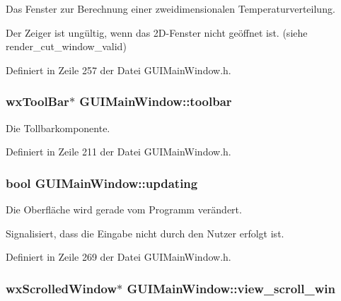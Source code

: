 Das Fenster zur Berechnung einer zweidimensionalen Temperaturverteilung. 

Der Zeiger ist ungültig, wenn das 2\-D-\/\-Fenster nicht geöffnet ist. (siehe render\-\_\-cut\-\_\-window\-\_\-valid) 

Definiert in Zeile 257 der Datei G\-U\-I\-Main\-Window.\-h.

\hypertarget{classGUIMainWindow_a8a8638fa87b4080e2242812f3d7e469e}{
\subsubsection[{toolbar}]{\setlength{\rightskip}{0pt plus 5cm}wx\-Tool\-Bar$\ast$ G\-U\-I\-Main\-Window\-::toolbar\hspace{0.3cm}{\ttfamily [private]}}}\label{classGUIMainWindow_a8a8638fa87b4080e2242812f3d7e469e}


Die Tollbarkomponente. 



Definiert in Zeile 211 der Datei G\-U\-I\-Main\-Window.\-h.

\hypertarget{classGUIMainWindow_afdc35b04c0fe94e4d0080f659ecbce8c}{
\subsubsection[{updating}]{\setlength{\rightskip}{0pt plus 5cm}bool G\-U\-I\-Main\-Window\-::updating\hspace{0.3cm}{\ttfamily [private]}}}\label{classGUIMainWindow_afdc35b04c0fe94e4d0080f659ecbce8c}


Die Oberfläche wird gerade vom Programm verändert. 

Signalisiert, dass die Eingabe nicht durch den Nutzer erfolgt ist. 

Definiert in Zeile 269 der Datei G\-U\-I\-Main\-Window.\-h.

\hypertarget{classGUIMainWindow_ad440f7451fd3fdabbe48518a89e61e45}{
\subsubsection[{view\-\_\-scroll\-\_\-win}]{\setlength{\rightskip}{0pt plus 5cm}wx\-Scrolled\-Window$\ast$ G\-U\-I\-Main\-Window\-::view\-\_\-scroll\-\_\-win\hspace{0.3cm}{\ttfamily [private]}}}\label{classGUIMainWindow_ad440f7451fd3fdabbe48518a89e61e45}


